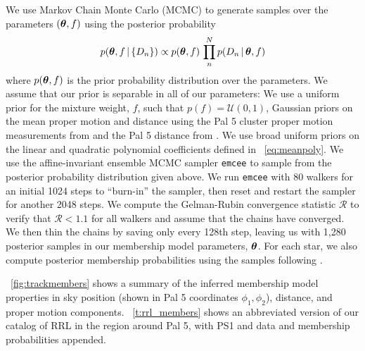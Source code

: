 \documentclass[twocolumn]{aastex63}
\begin{document}
We use Markov Chain Monte Carlo (MCMC) to generate samples over the parameters $(\boldsymbol{\theta}, f)$ using the posterior probability
\begin{equation}
    p(\bs{\theta}, f \given \{D_n\}) \propto p(\bs{\theta}, f) \, \prod_n^N p(D_n \given \bs{\theta}, f)
\end{equation}
where $p(\boldsymbol{\theta}, f)$ is the prior probability distribution over the parameters.
We assume that our prior is separable in all of our parameters: We use a uniform prior for the mixture weight, $f$, such that $p(f) = \mathcal{U}(0, 1)$, Gaussian priors on the mean proper motion and distance using the Pal 5 cluster proper motion measurements from \citet{Vasiliev:2019} and the Pal 5 distance from \citet{Kuepper:2015}.
We use broad uniform priors on the linear and quadratic polynomial coefficients defined in \equationname~\ref{eq:meanpoly}.
We use the affine-invariant ensemble MCMC sampler \texttt{emcee} \citep{emcee} to sample from the posterior probability distribution given above.
We run \texttt{emcee} with 80 walkers for an initial 1024 steps to ``burn-in'' the sampler, then reset and restart the sampler for another 2048 steps.
We compute the Gelman-Rubin convergence statistic $\mathcal{R}$ \citep{Gelman:1992} to verify that $\mathcal{R} < 1.1$ for all walkers and assume that the chains have converged.
We then thin the chains by saving only every 128th step, leaving us with 1,280 posterior samples in our membership model parameters, $\boldsymbol{\theta}$.
For each star, we also compute posterior membership probabilities using the samples following \citet{DFM:blog}.

\figurename~\ref{fig:trackmembers} shows a summary of the inferred membership model properties in sky position (shown in Pal 5 coordinates $\phi_1, \phi_2$), distance, and proper motion components.
\tablename~\ref{t:rrl_members} shows an abbreviated version of our catalog of RRL in the region around Pal 5, with PS1 and \Gaia data and membership probabilities appended.
\end{document}

